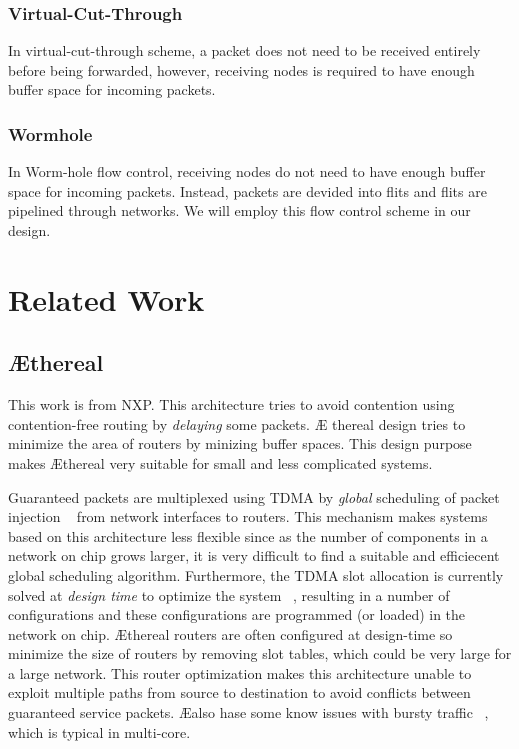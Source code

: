 \documentclass[conference, twocolumn]{IEEEtran}
\theoremstyle{definition}
\begin{document}
\subsubsection{Virtual-Cut-Through}
In virtual-cut-through scheme, a packet does not need to be received entirely
before being forwarded, however, receiving nodes is required to have enough
buffer space for incoming packets.
\subsubsection{Wormhole}
In Worm-hole flow control, receiving nodes do not need to have enough buffer
space for incoming packets. Instead, packets are devided into flits and flits
are pipelined through networks. We will employ this flow control scheme in our
design.
\section{Related Work}
\subsection{\AE thereal}
This work \cite{Goossens_chapter4} is from NXP. This architecture tries to avoid
contention using contention-free routing by {\em delaying} some packets. \AE
thereal design tries to minimize the area of routers by minizing buffer spaces.
This design purpose makes \AE thereal very suitable for small and less
complicated systems.

Guaranteed packets are multiplexed using TDMA by {\em global} scheduling of
packet injection ~\cite{Moonen07SPRINGER} from network interfaces to
routers. This mechanism makes systems based on this architecture less flexible
since as the number of components in a network on chip grows larger, it is very
difficult to find a suitable and efficiecent {global  scheduling} algorithm.
Furthermore, the TDMA slot allocation is currently solved at {\em design time}
to optimize the system ~\cite{Moonen07SPRINGER}, resulting in a number of
configurations and these configurations are programmed (or loaded) in the
network on chip. \AE thereal routers are often configured at design-time so
minimize the size of routers by removing slot tables, which could be very large
for a large network. This router optimization makes this architecture unable to
exploit multiple paths from source to destination to avoid conflicts between
guaranteed service packets. \AE also hase some know issues with bursty traffic
~\cite{Hansson07ISSS}, which is typical in multi-core.
\end{document}
